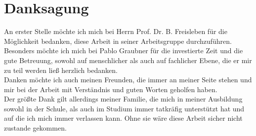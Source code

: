 {} %
\chapter*{Danksagung}

An erster Stelle m\"ochte ich mich bei Herrn Prof. Dr. B. Freisleben f\"ur die M\"oglichkeit bedanken, diese Arbeit in seiner Arbeitsgruppe durchzuf\"uhren.
\vspace{10pt}\\
Besonders m\"ochte ich mich  bei Pablo Graubner f\"ur die investierte Zeit und die gute Betreuung, sowohl auf menschlicher als auch auf fachlicher Ebene, die er mir zu teil werden lie\ss {} herzlich bedanken.
\vspace{10pt}\\
Danken m\"ochte ich auch meinen Freunden, die immer an meiner Seite stehen und mir bei der Arbeit mit Verst\"andnis und guten Worten geholfen haben.
\vspace{10pt}\\
Der gr\"o\ss te Dank gilt allerdings meiner Familie, die mich in meiner Ausbildung sowohl in der Schule, als auch im Studium immer tatkr\"afig unterst\"utzt hat und auf die ich mich immer verlassen kann. Ohne sie w\"are diese Arbeit sicher nicht zustande gekommen.
